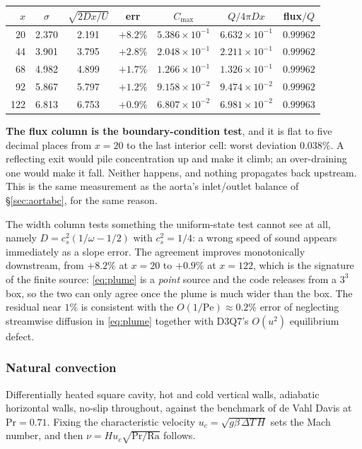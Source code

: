 \documentclass[11pt,a4paper]{article}
\begin{document}
\begin{center}
\begin{tabular}{rcccccc}
\toprule
$x$ & $\sigma$ & $\sqrt{2Dx/U}$ & err & $C_{\max}$ & $Q/4\pi Dx$ & flux$/Q$ \\
\midrule
 20 & 2.370 & 2.191 & $+8.2\%$ & $5.386\times10^{-1}$ & $6.632\times10^{-1}$ & $0.99962$ \\
 44 & 3.901 & 3.795 & $+2.8\%$ & $2.048\times10^{-1}$ & $2.211\times10^{-1}$ & $0.99962$ \\
 68 & 4.982 & 4.899 & $+1.7\%$ & $1.266\times10^{-1}$ & $1.326\times10^{-1}$ & $0.99962$ \\
 92 & 5.867 & 5.797 & $+1.2\%$ & $9.158\times10^{-2}$ & $9.474\times10^{-2}$ & $0.99962$ \\
122 & 6.813 & 6.753 & $+0.9\%$ & $6.807\times10^{-2}$ & $6.981\times10^{-2}$ & $0.99963$ \\
\bottomrule
\end{tabular}
\end{center}

\noindent \textbf{The flux column is the boundary-condition test}, and it is
flat to five decimal places from $x=20$ to the last interior cell: worst
deviation $0.038\%$. A reflecting exit would pile concentration up and make it
climb; an over-draining one would make it fall. Neither happens, and nothing
propagates back upstream. This is the same measurement as the aorta's
inlet/outlet balance of \S\ref{sec:aortabc}, for the same reason.

The width column tests something the uniform-state test cannot see at all,
namely $D = c_s^2(1/\omega - 1/2)$ with $c_s^2 = 1/4$: a wrong speed of sound
appears immediately as a slope error. The agreement improves monotonically
downstream, from $+8.2\%$ at $x=20$ to $+0.9\%$ at $x=122$, which is the
signature of the finite source: \eqref{eq:plume} is a \emph{point} source and
the code releases from a $3^3$ box, so the two can only agree once the plume is
much wider than the box. The residual near $1\%$ is consistent with the
$O(1/\mathrm{Pe}) \approx 0.2\%$ error of neglecting streamwise diffusion in
\eqref{eq:plume} together with D3Q7's $O(u^2)$ equilibrium defect.
\subsubsection{Natural convection}
\label{sec:natconv}

Differentially heated square cavity, hot and cold vertical walls, adiabatic
horizontal walls, no-slip throughout, against the benchmark of de Vahl Davis
\cite{devahldavis1983} at $\mathrm{Pr}=0.71$. Fixing the characteristic velocity
$u_c=\sqrt{g\beta\,\Delta T\,H}$ sets the Mach number, and then
$\nu = H u_c\sqrt{\mathrm{Pr}/\mathrm{Ra}}$ follows.
\end{document}
